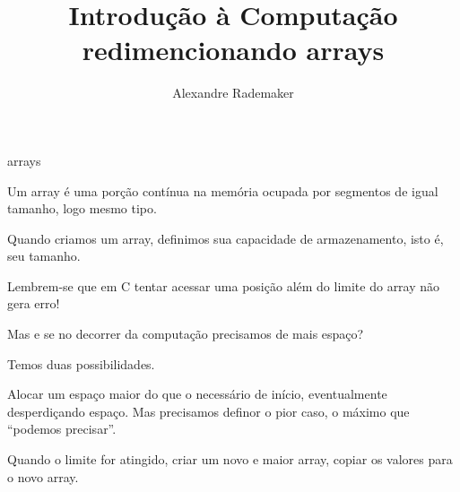 \documentclass{beamer}
\title{Introdução à Computação \\ redimencionando arrays}
\author{Alexandre Rademaker}
\date{}
\begin{document}
\begin{frame}
 \maketitle
\end{frame}

\begin{frame}{arrays}

  Um array é uma porção contínua na memória ocupada por segmentos de
  igual tamanho, logo mesmo tipo.

  Quando criamos um array, definimos sua capacidade de armazenamento,
  isto é, seu tamanho.

  {\color{red} Lembrem-se} que em C tentar acessar uma posição além do
  limite do array não gera erro!

  Mas e se no decorrer da computação precisamos de mais espaço?

  \framebreak

  Temos duas possibilidades.

  Alocar um espaço maior do que o necessário de início, eventualmente
  desperdiçando espaço. Mas precisamos definor o pior caso, o máximo
  que ``podemos precisar''.

  Quando o limite for atingido, criar um novo e maior array, copiar os
  valores para o novo array.

\end{frame}
\end{document}
